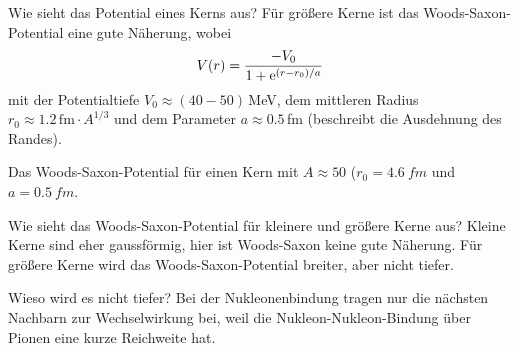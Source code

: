 \begin{fquestion}{Wie sieht das Potential eines Kerns aus?}
    Für größere Kerne ist das Woods-Saxon-Potential eine gute Näherung, wobei
    $$V(r) = \frac{-V_0}{1 + \text{e}^{(r-r_0) / a}}$$
    mit der Potentialtiefe $V_0 \approx (40-50)\,$MeV, dem mittleren Radius $r_0 \approx 1.2\,\mathrm{fm}\cdot A^{1/3}$ und dem Parameter $a\approx 0.5\,$fm (beschreibt die Ausdehnung des Randes). 
    
    
    Das Woods-Saxon-Potential für einen Kern mit $A \approx 50$ ($r_0 = \SI{4.6}{fm}$ und $a = \SI{0.5}{fm}$.
    \begin{center}
    \end{center}
\end{fquestion}


\begin{fquestion}{Wie sieht das Woods-Saxon-Potential für kleinere und größere Kerne aus?}
    Kleine Kerne sind eher gaussförmig, hier ist Woods-Saxon keine gute Näherung. 
    Für größere Kerne wird das Woods-Saxon-Potential breiter, aber nicht tiefer. 
\end{fquestion}

\begin{fquestion}{Wieso wird es nicht tiefer?}
    Bei der Nukleonenbindung tragen nur die nächsten Nachbarn zur Wechselwirkung bei, weil die Nukleon-Nukleon-Bindung über Pionen eine kurze Reichweite hat.
\end{fquestion}

